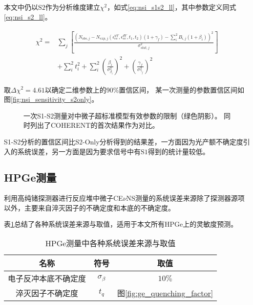 本文中仍以$\mathrm{S2}$作为分析维度建立$\chi^2$，如式\ref{eq:nsi_s1s2_ll}，其中参数定义同式\ref{eq:nsi_s2_ll}。

\begin{align}
    \label{eq:nsi_s1s2_ll}
    \begin{split}
    \chi^2 =& \sum_j\left[\frac{\left(N_{obs,j} - N_{exp,j}(\epsilon^{uV}_{ee}, \epsilon^{dV}_{ee}, t_1, t_2)(1 + \gamma_f) 
    - \sum_{i}^2 B_{i,j}(1 + \beta_i)\right)^2}{\sigma^2_{stat,j}}\right] \\
    & + \sum_{i}^2 t_i^2 + \sum_{i}^2(\frac{\beta_i}{\sigma^2_{\beta_i}})^2 + (\frac{\gamma_f}{\sigma^2_{\gamma_f}})^2
    \end{split}
\end{align}

取$\Delta \chi^2=4.61$以确定二维参数上的90\%置信区间，
某一次测量的参数置信区间如图\ref{fig:nsi_sensitivity_s2only}。

\begin{figure}
  \centering
  
  \caption{\label{fig:nsi_sensitivity_s1s2} 一次S1-S2测量对中微子超标准模型有效参数的限制（绿色阴影）。
  同时列出了COHERENT的首次结果作为对比\cite{akimov_observation_2017}。}
\end{figure}

S1-S2分析的置信区间比S2-Only分析得到的结果差，一方面因为光产额不确定度引入的系统误差，另一方面是因为要求信号中有$\mathrm{S1}$得到的统计量较低。

\subsection{HPGe测量}

利用高纯锗探测器进行反应堆中微子CE$\nu$NS测量的系统误差来源除了探测器源项以外，主要来自淬灭因子的不确定度和本底的不确定度。

表\ref{tab:sys_error_ge}总结了各种系统误差来源与取值，适用于本文所有HPGe上的灵敏度预测。

\begin{table}
  \centering
  \caption{HPGe测量中各种系统误差来源与取值}
  \begin{tabular}{ccc}
    \toprule
    名称 & 符号 & 取值 \\
    \midrule
    电子反冲本底不确定度 & $\sigma_{\beta}$ & $10\%$ \\
    淬灭因子不确定度 & $t_q$ & 图\ref{fig:ge_quenching_factor} \\
    \bottomrule
  \end{tabular}
  \label{tab:sys_error_ge}
\end{table}

